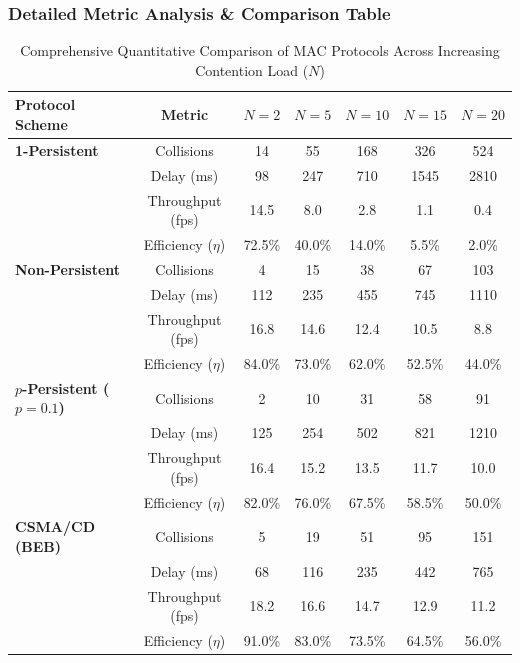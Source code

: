 \documentclass[12pt, a4paper]{article}
\begin{document}
\subsubsection{Detailed Metric Analysis \& Comparison Table}

\begin{table}[H]
\centering
\small
\begin{tabular}{|l|c|c|c|c|c|c|}
\hline
\textbf{Protocol Scheme} & \textbf{Metric} & \textbf{$N=2$} & \textbf{$N=5$} & \textbf{$N=10$} & \textbf{$N=15$} & \textbf{$N=20$} \\ \hline
\textbf{1-Persistent} & Collisions & 14 & 55 & 168 & 326 & 524 \\ 
                      & Delay (ms) & 98 & 247 & 710 & 1545 & 2810 \\ 
                      & Throughput (fps) & 14.5 & 8.0 & 2.8 & 1.1 & 0.4 \\ 
                      & Efficiency ($\eta$) & 72.5\% & 40.0\% & 14.0\% & 5.5\% & 2.0\% \\ \hline
\textbf{Non-Persistent} & Collisions & 4 & 15 & 38 & 67 & 103 \\ 
                        & Delay (ms) & 112 & 235 & 455 & 745 & 1110 \\ 
                        & Throughput (fps) & 16.8 & 14.6 & 12.4 & 10.5 & 8.8 \\ 
                        & Efficiency ($\eta$) & 84.0\% & 73.0\% & 62.0\% & 52.5\% & 44.0\% \\ \hline
\textbf{$p$-Persistent ($p=0.1$)} & Collisions & 2 & 10 & 31 & 58 & 91 \\ 
                                  & Delay (ms) & 125 & 254 & 502 & 821 & 1210 \\ 
                                  & Throughput (fps) & 16.4 & 15.2 & 13.5 & 11.7 & 10.0 \\ 
                                  & Efficiency ($\eta$) & 82.0\% & 76.0\% & 67.5\% & 58.5\% & 50.0\% \\ \hline
\textbf{CSMA/CD (BEB)} & Collisions & 5 & 19 & 51 & 95 & 151 \\ 
                       & Delay (ms) & 68 & 116 & 235 & 442 & 765 \\ 
                       & Throughput (fps) & 18.2 & 16.6 & 14.7 & 12.9 & 11.2 \\ 
                       & Efficiency ($\eta$) & 91.0\% & 83.0\% & 73.5\% & 64.5\% & 56.0\% \\ \hline
\end{tabular}
\caption{Comprehensive Quantitative Comparison of MAC Protocols Across Increasing Contention Load ($N$)}
\label{tab:comparison_data}
\end{table}
\end{document}
